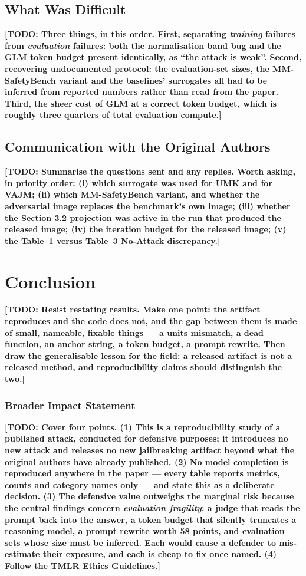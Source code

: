 \documentclass[10pt]{article} %
\newcommand{\todo}[1]{\textbf{[TODO: #1]}}
\begin{document}
\subsection{What Was Difficult}

\todo{Three things, in this order. First, separating \emph{training} failures from \emph{evaluation} failures: both the normalisation band bug and the GLM token budget present identically, as ``the attack is weak''. Second, recovering undocumented protocol: the evaluation-set sizes, the MM-SafetyBench variant and the baselines' surrogates all had to be inferred from reported numbers rather than read from the paper. Third, the sheer cost of GLM at a correct token budget, which is roughly three quarters of total evaluation compute.}

\subsection{Communication with the Original Authors}

\todo{Summarise the questions sent and any replies. Worth asking, in priority order: (i) which surrogate was used for UMK and for VAJM; (ii) which MM-SafetyBench variant, and whether the adversarial image replaces the benchmark's own image; (iii) whether the Section 3.2 projection was active in the run that produced the released image; (iv) the iteration budget for the released image; (v) the Table~1 versus Table~3 No-Attack discrepancy.}

\section{Conclusion}
\label{sec:conclusion}

\todo{Resist restating results. Make one point: the artifact reproduces and the code does not, and the gap between them is made of small, nameable, fixable things --- a units mismatch, a dead function, an anchor string, a token budget, a prompt rewrite. Then draw the generalisable lesson for the field: a released artifact is not a released method, and reproducibility claims should distinguish the two.}

\subsubsection*{Broader Impact Statement}
\todo{Cover four points. (1) This is a reproducibility study of a published attack, conducted for defensive purposes; it introduces no new attack and releases no new jailbreaking artifact beyond what the original authors have already published. (2) No model completion is reproduced anywhere in the paper --- every table reports metrics, counts and category names only --- and state this as a deliberate decision. (3) The defensive value outweighs the marginal risk because the central findings concern \emph{evaluation fragility}: a judge that reads the prompt back into the answer, a token budget that silently truncates a reasoning model, a prompt rewrite worth 58 points, and evaluation sets whose size must be inferred. Each would cause a defender to mis-estimate their exposure, and each is cheap to fix once named. (4) Follow the TMLR Ethics Guidelines.}
\end{document}
